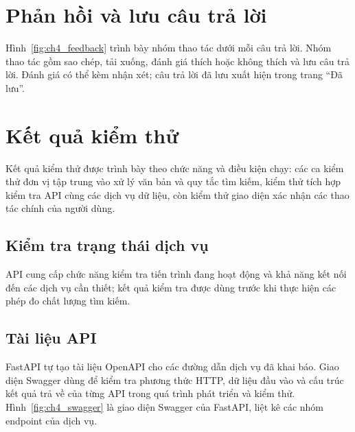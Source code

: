\documentclass[12pt,a4paper,oneside]{report}
\begin{document}
\section{Phản hồi và lưu câu trả lời}
Hình~\ref{fig:ch4_feedback} trình bày nhóm thao tác dưới mỗi câu trả lời.
Nhóm thao tác gồm sao chép, tải xuống, đánh giá thích hoặc không thích và lưu câu trả lời. Đánh giá có thể kèm nhận xét; câu trả lời đã lưu xuất hiện trong trang ``Đã lưu''.
\section{Kết quả kiểm thử}
Kết quả kiểm thử được trình bày theo chức năng và điều kiện chạy: các ca kiểm thử đơn vị tập trung vào xử lý văn bản và quy tắc tìm kiếm, kiểm thử tích hợp kiểm tra API cùng các dịch vụ dữ liệu, còn kiểm thử giao diện xác nhận các thao tác chính của người dùng.

\subsection{Kiểm tra trạng thái dịch vụ}
API cung cấp chức năng kiểm tra tiến trình đang hoạt động và khả năng kết nối đến các dịch vụ cần thiết; kết quả kiểm tra được dùng trước khi thực hiện các phép đo chất lượng tìm kiếm.

\subsection{Tài liệu API}
FastAPI tự tạo tài liệu OpenAPI cho các đường dẫn dịch vụ đã khai báo. Giao diện Swagger dùng để kiểm tra phương thức HTTP, dữ liệu đầu vào và cấu trúc kết quả trả về của từng API trong quá trình phát triển và kiểm thử.
Hình~\ref{fig:ch4_swagger} là giao diện Swagger của FastAPI, liệt kê các nhóm endpoint của dịch vụ.
\end{document}
